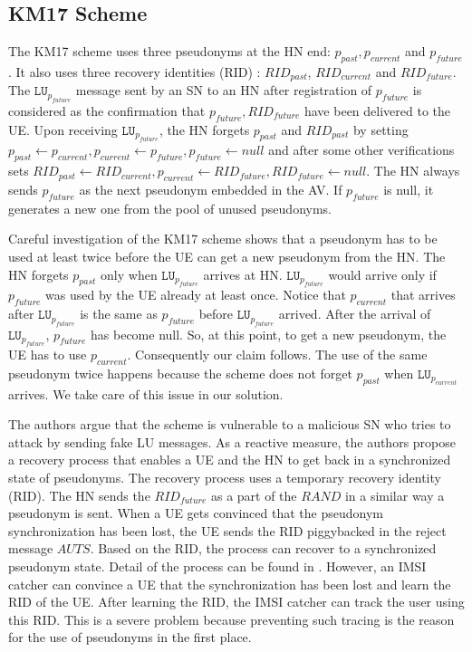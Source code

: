\documentclass{llncs} %
\begin{document}
\subsection{KM17 Scheme} \label{sec:km17scheme}
The KM17 scheme uses three pseudonyms at the HN end: $p_{past},p_{current}$ and $p_{future}$. It also uses three recovery identities (RID) : $RID_{past}$, $RID_{current}$ and $RID_{future}$. The $\texttt{LU}_{p_{future}}$ message sent by an SN to an HN after registration of $p_{future}$ is considered as the confirmation that $p_{future}, RID_{future}$ have been delivered to the UE. Upon receiving $\texttt{LU}_{p_{future}}$, the HN forgets $p_{past}$ and $RID_{past}$ by setting $p_{past} \leftarrow p_{current}, p_{current} \leftarrow p_{future}, p_{future} \leftarrow null$ and after some other verifications sets $RID_{past} \leftarrow RID_{current}, p_{current} \leftarrow RID_{future}, RID_{future} \leftarrow null$. The HN always sends $p_{future}$ as the next pseudonym embedded in the AV. If $p_{future}$ is null, it generates a new one from the pool of unused pseudonyms.


Careful investigation of the KM17 scheme shows that a pseudonym has to be used at least twice before the UE can get a new pseudonym from the HN. The HN forgets $p_{past}$ only when $\texttt{LU}_{p_{future}}$ arrives at HN. $\texttt{LU}_{p_{future}}$ would arrive only if $p_{future}$ was used by the UE already at least once. Notice that $p_{current}$ that arrives after $\texttt{LU}_{p_{future}}$ is the same as $p_{future}$ before $\texttt{LU}_{p_{future}}$ arrived. After the arrival of $\texttt{LU}_{p_{future}}$, $p_{future}$ has become null. So, at this point, to get a new pseudonym, the UE has to use $p_{current}$. Consequently our claim follows. The use of the same pseudonym twice happens because the scheme does not forget $p_{past}$ when $\texttt{LU}_{p_{current}}$ arrives. We take care of this issue in our solution.

The authors argue that the scheme is vulnerable to a malicious SN who tries to attack by sending fake LU messages. As a reactive measure, the authors propose a recovery process that enables a UE and the HN to get back in a synchronized state of pseudonyms. The recovery process uses a temporary recovery identity (RID). The HN sends the $RID_{future}$ as a part of the $RAND$ in a similar way a pseudonym is sent. When a UE gets convinced that the pseudonym synchronization has been lost, the UE sends the RID piggybacked in the reject message $AUTS$. Based on the RID, the process can recover to a synchronized pseudonym state. Detail of the process can be found in \cite{wisec17}. However, an IMSI catcher can convince a UE that the synchronization has been lost and learn the RID of the UE. After learning the RID, the IMSI catcher can track the user using this RID. This is a severe problem because preventing such tracing is the reason for the use of pseudonyms in the first place.
\end{document}

